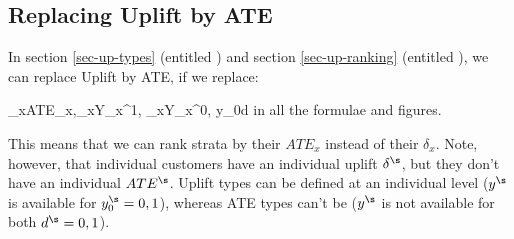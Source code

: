 \subsection{Replacing Uplift by ATE}
In section \ref{sec-up-types} (entitled )
and section \ref{sec-up-ranking} (entitled 
),
we can replace Uplift by ATE, if we replace:

\beq
\delta_x\rarrow ATE_x,\quad \av{\rvy}_x\rarrow Y_x^1,\quad
{}_x\rarrow Y_x^0, \quad y_0\rarrow d
\eeq
in all the formulae and figures.

This means that we can rank strata by their $ATE_x$ instead of
their $\delta_x$. Note, however, that individual customers
have an individual uplift $\delta^\s$, but they don't have an
individual $ATE^\s$.
Uplift types
can be defined at an individual level
($y^\s$ is available for
$y^\s_0=0, 1$), whereas ATE types can't be
($y^\s$ is not available for both $d^\s=0,1$).


